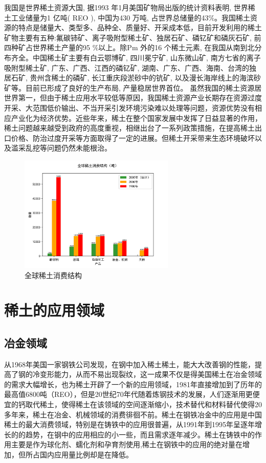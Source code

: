 \documentclass[twoside,twocolumn]{article}
\begin{document}
我国是世界稀土资源大国, 据1993 年1月美国矿物局出版的统计资料表明, 世界稀土工业储量为1 亿吨( REO ), 中国为430 万吨, 占世界总储量的43$\%$。我国稀土资源的特点是储量大、类型多、品种全、质量好、开采成本低，目前开发利用的稀土矿物主要有五种:氟碳铈矿、离子吸附型稀土矿、独居石矿、磷钇矿和磷灰石矿, 前四种矿占世界稀土产量的95 $\%$以上。除Pm 外的16 个稀土元素, 在我国从南到北分布齐全。中国稀土矿主要有白云鄂博矿, 四川冕宁矿, 山东微山矿, 南方七省的离子吸附型稀土矿, 广东、广西、江西的磷钇矿, 湖南、广东、广西、海南、台湾的独居石矿, 贵州含稀土的磷矿, 长江重庆段淤砂中的钪矿, 以及漫长海岸线上的海滨砂矿等。目前已形成了良好的生产布局, 产量稳居世界首位。\cite{RN6}
虽然我国的稀土资源居世界第一，但由于稀土应用水平较低等原因，我国稀土资源产业长期存在资源过度开采、大范围低价输出、不当开采引发环境污染难以处理等问题，资源优势没有相应产业化为经济优势。近些年来，稀土在整个国家发展中发挥了日益显著的作用，稀土问题越来越受到政府的高度重视，相继出台了一系列政策措施，在提高稀土出口价格、防治过度开采等方面取得了一定的进展。但稀土开采带来生态环境破坏以及滥采乱挖等问题仍然未能根治。


 \begin{figure}
  \centering
  \includegraphics[width=20em]{figure6.png}
  \caption{全球稀土消费结构\cite{RN2}}
\end{figure}

\section{稀土的应用领域}
\subsection{冶金领域}
从1968年美国一家钢铁公司发现，在钢中加入稀土稀土，能大大改善钢的性能，提高了钢的冷变形能力，从而不易出现裂纹，这一成果不仅是得美国稀土在冶金领域的需求大幅增长，也为稀土开辟了一个新的应用领域，1981年直接增加到了历年的最高值6800吨（REO），但是20世纪70年代随着炼钢技术的发展，人们逐渐用更便宜的钙取代稀土，使得稀土在该领域的空间逐渐缩小，技术替代和材料替代使得20多年来，稀土在冶金、机械领域的消费徘徊不前。\cite{RN2}稀土在钢铁冶金中的应用是中国稀土的最大消费领域，特别是在铸铁中的应用很普遍，从1991年到1995年呈逐年增长的的趋势，在钢中的应用相应的小一些，而且需求逐年减少。稀土在铸铁中的作用主要是作为球化剂、蠕化剂和孕育剂使用,稀土在钢铁中的应用的绝对量在增加，但所占国内应用量比例却是在降低。\cite{RN55}
\end{document}
